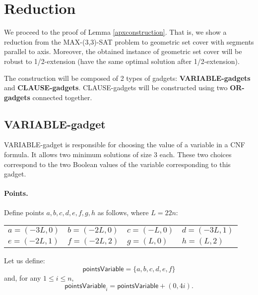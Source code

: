 \section{Reduction}
\label{construction_description}
We proceed to the proof of Lemma \ref{apxconstruction}.
That is, we show a reduction from the MAX-(3,3)-SAT problem
to geometric set cover with segments
parallel to axis. Moreover, the obtained instance
of geometric set cover will be robust
to 1/2-extension (have the same optimal solution
after 1/2-extension).

The construction will be composed of 2 types of gadgets:
\textbf{VARIABLE-gadgets} and \textbf{CLAUSE-gadgets}.
CLAUSE-gadgets will be constructed using two \textbf{OR-gadgets}
connected together.

\subsection{VARIABLE-gadget}

VARIABLE-gadget is responsible for choosing the value of a variable
in a CNF formula. It allows two minimum solutions of size 3 each.
These two choices correspond to the two Boolean values of the variable
corresponding to this gadget.

\paragraph{Points.}

Define points $a,b,c,d,e,f,g,h$ as follows, where $L = 22n$:


\newcommand{\pointsVarNoArg}{\mathsf{pointsVariable} }
\newcommand{\pointsVar}[1]{\mathsf{pointsVariable}_{#1} }
\newcommand{\chooseVar}[2]{\mathsf{chooseVariable}^{#1}_{#2} }
\newcommand{\segmentsVar}[1]{\mathsf{segmentsVariable}_{#1} }



\begin{center}
\begin{tabular}{ l l l l}
	$a = (-3L, 0)$ &
	$b = (-2L, 0)$ & 
	$c = (-L, 0)$ & 
	$d = (-3L, 1)$ \\  
	$e = (-2L, 1)$ & 
	$f = (-2L, 2)$ &
	$g = (L, 0)$ &
	$h = (L, 2)$
\end{tabular}
\end{center}


Let us define:
$$\pointsVarNoArg =  \{a, b, c, d, e, f\}$$
and, for any $1 \le i \le n$,
$$\pointsVar{i} = \pointsVarNoArg + (0, 4i).$$


